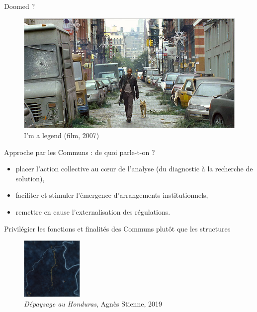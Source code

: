 \documentclass[newPxFont]{beamer}
\begin{document}
\begin{frame}[c]{Doomed ?}
\vspace{-1cm}

\begin{figure}
  \includegraphics[width=\textwidth]{img/im_legend-600.jpg}
  \caption{I'm a legend (film, 2007)}
\end{figure}
\end{frame}

\begin{frame}[c]{Approche par les Communs : de quoi parle-t-on ?}
  \vspace{-1cm}
  \begin{itemize}
    \item placer l'action collective au cœur de l'analyse (du diagnostic à la recherche de solution),
    \item faciliter et stimuler l'émergence d'arrangements institutionnels,
    \item remettre en cause l'externalisation des régulations.
  \end{itemize}
  Privilégier les fonctions et finalités des Communs plutôt que les structures 
  \begin{figure}
    \includegraphics[height=3cm]{img/Honduras.jpg}
    \caption{\textit{Dépaysage au Honduras}, Agnès Stienne, 2019}
  \end{figure}
  \end{frame}

\end{document}
